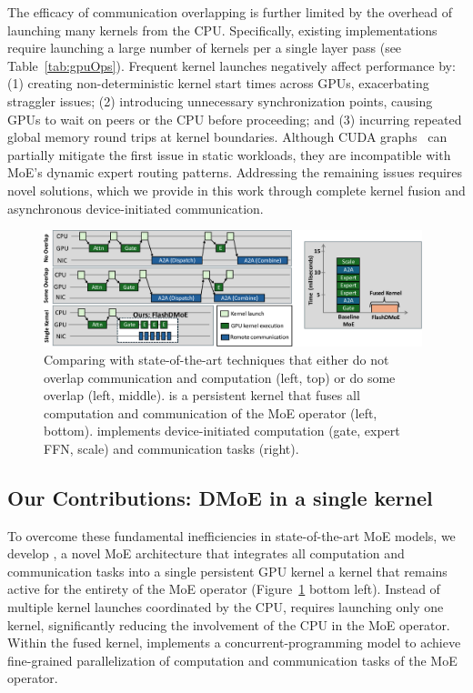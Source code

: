 The efficacy of communication overlapping is further limited by the overhead of
launching many kernels from the CPU\@.
Specifically, existing implementations~\cite{pmlr-v162-rajbhandari22a, comet, megatron, fastermoe}
require launching a large number of kernels per a single layer pass (see Table~\ref{tab:gpuOps}).
Frequent kernel launches negatively affect performance by:
(1) creating non-deterministic kernel start times across GPUs, exacerbating straggler issues;
(2) introducing unnecessary synchronization points, causing GPUs to wait on peers or the CPU before proceeding;
and (3) incurring repeated global memory round trips at kernel boundaries.
Although CUDA graphs~\cite{cuda_graphs_nvidia_blog} can partially mitigate the first issue in static workloads,
they are incompatible with MoE's dynamic expert routing patterns.
Addressing the remaining issues requires novel solutions,
which we provide in this work through complete kernel fusion and asynchronous device-initiated communication.


\begin{figure}[!ht]
    \centering
    \includegraphics[width=0.98\textwidth, keepaspectratio]{figures/intro-fig}
    \caption{Comparing \sysname with state-of-the-art techniques that either do not overlap communication and computation (left, top) or do some overlap (left, middle). \sysname is a persistent kernel that fuses all computation and communication of the MoE operator (left, bottom). \sysname implements device-initiated computation (gate, expert FFN, scale) and communication tasks (right).}
    \label{fig:intro}
    \vspace{-10pt}
\end{figure}

\subsection{Our Contributions: DMoE in a single kernel}
To overcome these fundamental inefficiencies in state-of-the-art MoE models, we develop \sysname,
a novel MoE architecture that integrates all computation and communication tasks into a single persistent GPU kernel
\ie a kernel that remains active for the entirety of the MoE operator (Figure~\ref{fig:intro} bottom left).
Instead of multiple kernel launches coordinated by the CPU, \sysname requires launching only one kernel,
significantly reducing the involvement of the CPU in the MoE operator.
Within the fused kernel, \sysname implements a concurrent-programming model to achieve fine-grained parallelization of
computation and communication tasks of the MoE operator.

